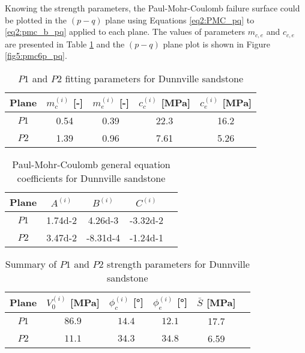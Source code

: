 Knowing the strength parameters, the Paul-Mohr-Coulomb failure surface could be plotted in the $(p-q)$ plane using Equations \ref{eq2:PMC_pq} to \ref{eq2:pmc_b_pq} applied to each plane. The values of parameters $m_{c,e}$ and $c_{c,e}$ are presented in Table \ref{tb5:dunn_pq_para} and the $(p-q)$ plane plot is shown in Figure \ref{fig5:pmc6p_pq}.

\begin{table} [p]
    \centering 
    \captionsetup{justification=centering}
    \caption{$P1$ and $P2$ fitting parameters for Dunnville sandstone}
    \begin{tabular}{ccccc}
        \hline 
        Plane & $m_c^{(i)}$ [-] & $m_e^{(i)}$ [-] & $c_c^{(i)}$ [\si{MPa}] & $c_e^{(i)}$ [\si{MPa}] \\
        \hline
        \hline
        $P1$ & 0.54 & 0.39 & 22.3 & 16.2 \\
        $P2$ & 1.39 & 0.96 & 7.61 & 5.26\\
        \hline
    \end{tabular}
    \label{tb5:dunn_pq_para}
\end{table}

\begin{table} [p]
    \centering 
    \captionsetup{justification=centering}
    \caption{Paul-Mohr-Coulomb general equation coefficients for Dunnville sandstone}
    \begin{tabular}{ccccc}
        \hline 
        Plane & $A^{(i)}$ & $B^{(i)}$ & $C^{(i)}$ \\
        \hline
        \hline
        $P1$ & \num{1.74d-2} & \num{4.26d-3} & \num{-3.32d-2} \\
        $P2$ & \num{3.47d-2} & \num{-8.31d-4} & \num{-1.24d-1} \\
        \hline
    \end{tabular}
    \label{tb5:dunn_abc}
\end{table}

\begin{table} [p]
    \centering 
    \captionsetup{justification=centering}
    \caption{Summary of $P1$ and $P2$ strength parameters for Dunnville sandstone}
    \begin{tabular}{cccccc}
        \hline 
        Plane & $V_0^{(i)}$ [\si{MPa}] & $\phi_c^{(i)}$ [\si{\degree}] & $\phi_e^{(i)}$ [\si{\degree}] & $\bar{S}$ [\si{MPa}]\\
        \hline
        \hline
        $P1$ & $86.9$ & $14.4$ & $12.1$ & 17.7\\
        $P2$ & $11.1$ & $34.3$ & $34.8$ & 6.59\\
        \hline
    \end{tabular}
    \label{tb5:dunn_summary}
\end{table}

